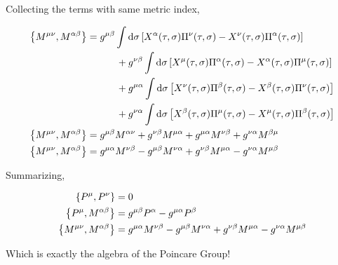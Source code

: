Collecting the terms with same metric index,

\begin{align*}
    \acomm{M^{\mu\nu}}{M^{\alpha\beta}}&=g^{\mu\beta}\int\dd{\sigma}\qty[X^\alpha\qty(\tau,\sigma)\Pi^\nu\qty(\tau,\sigma)-X^\nu\qty(\tau,\sigma)\Pi^\alpha\qty(\tau,\sigma)]\\
    &\quad\quad\quad+g^{\nu\beta}\int\dd{\sigma}\qty[X^\mu\qty(\tau,\sigma)\Pi^\alpha\qty(\tau,\sigma)-X^\alpha\qty(\tau,\sigma)\Pi^\mu\qty(\tau,\sigma)]\\
    &\quad\quad\quad+g^{\mu\alpha}\int\dd{\sigma}\qty[X^\nu\qty(\tau,\sigma)\Pi^\beta\qty(\tau,\sigma)-X^\beta\qty(\tau,\sigma)\Pi^\nu\qty(\tau,\sigma)]\\
    &\quad\quad\quad+g^{\nu\alpha}\int\dd{\sigma}\qty[X^\beta\qty(\tau,\sigma)\Pi^\mu\qty(\tau,\sigma)-X^\mu\qty(\tau,\sigma)\Pi^\beta\qty(\tau,\sigma)]\\
    \acomm{M^{\mu\nu}}{M^{\alpha\beta}}&=g^{\mu\beta}M^{\alpha\nu}+g^{\nu\beta}M^{\mu\alpha}+g^{\mu\alpha}M^{\nu\beta}+g^{\nu\alpha}M^{\beta\mu}\\
    \acomm{M^{\mu\nu}}{M^{\alpha\beta}}&=g^{\mu\alpha}M^{\nu\beta}-g^{\mu\beta}M^{\nu\alpha}+g^{\nu\beta}M^{\mu\alpha}-g^{\nu\alpha}M^{\mu\beta}
\end{align*}

Summarizing,

\begin{align*}
    \acomm{P^\mu}{P^\nu}&=0\\
    \acomm{P^\mu}{M^{\alpha\beta}}&=g^{\mu\beta}P^\alpha -g^{\mu\alpha}P^\beta\\
    \acomm{M^{\mu\nu}}{M^{\alpha\beta}}&=g^{\mu\alpha}M^{\nu\beta}-g^{\mu\beta}M^{\nu\alpha}+g^{\nu\beta}M^{\mu\alpha}-g^{\nu\alpha}M^{\mu\beta}
\end{align*}

Which is exactly the algebra of the Poincare Group!